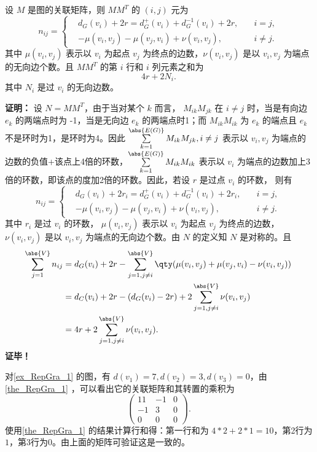 \begin{theorem}{}\label{the_RepGra_1}
设 $M$ 是图的关联矩阵，则 $MM^T$ 的 $(i,j)$ 元为
\begin{equation}
n_{ij}=\left\{\begin{aligned}
&d_G(v_i)+2r=d_G^+(v_i)+d_G^{-1}(v_i)+2r,\quad &i=j,\\
&-\mu(v_i,v_j)-\mu(v_j,v_i)+\nu(v_i,v_j),\quad &i\neq j.
\end{aligned}\right.~
\end{equation}
其中 $\mu(v_i,v_j)$ 表示以 $v_i$ 为起点 $v_j$ 为终点的边数，$\nu(v_i,v_j)$ 是以 $v_i,v_j$ 为端点的无向边个数。且 $MM^T$ 的第 $i$ 行和 $i$ 列元素之和为
\begin{equation}
4r+2N_i.~
\end{equation}
其中 $N_i$ 是过 $v_i$ 的无向边数。

\end{theorem}
\textbf{证明：}
设 $N=MM^T$，由于当对某个 $k$ 而言， $M_{ik}M_{jk}$ 在 $i\neq j$ 时，当是有向边 $e_k$ 的两端点时为 -1，当是无向边 $e_k$ 的两端点时1；而 $M_{ik}M_{ik}$ 为 $e_k$ 的端点且 $e_k$ 不是环时为1，是环时为4。因此 $\sum\limits_{k=1}^{\abs{E(G)}}M_{ik}M_{jk},i\neq j$ 表示以 $v_i,v_j$ 为端点的边数的负值+该点上4倍的环数，$\sum\limits_{k=1}^{\abs{E(G)}}M_{ik}M_{ik}$ 表示以 $v_i$ 为端点的边数加上3倍的环数，即该点的度加2倍的环数。因此，若设 $r$ 是过点 $v_i$ 的环数， 则有
\begin{equation}
n_{ij}=\left\{\begin{aligned}
&d_G(v_i)+2r_i=d_G^+(v_i)+d_G^{-1}(v_i)+2r_i,\quad &i=j,\\
&-\mu(v_i,v_j)-\mu(v_j,v_i)+\nu(v_i,v_j),\quad &i\neq j.
\end{aligned}\right.~
\end{equation}
其中 $r_i$ 是过 $v_i$ 的环数， $\mu(v_i,v_j)$ 表示以 $v_i$ 为起点 $v_j$ 为终点的边数，$\nu(v_i,v_j)$ 是以 $v_i,v_j$ 为端点的无向边个数。由 $N$ 的定义知 $N$ 是对称的。且 
\begin{equation}
\begin{aligned}
\sum_{j=1}^{\abs{V}}n_{ij}&=d_G(v_i)+2r-\sum_{j=1,j\neq i}^{\abs{V}}\qty(\mu(v_i,v_j)+\mu(v_j,v_i)-\nu(v_i,v_j))\\
&=d_C(v_i)+2r-(d_G(v_i)-2r)+2\sum_{j=1,j\neq i}^{\abs{V}}\nu(v_i,v_j)\\
&=4r+2\sum_{j=1,j\neq i}^{\abs{V}}\nu(v_i,v_j).
\end{aligned}
~
\end{equation}
\textbf{证毕！}
\begin{example}{}
对\autoref{ex_RepGra_1} 的图，有 $d(v_1)=7,d(v_2)=3,d(v_3)=0$，由\autoref{the_RepGra_1} ，可以看出它的关联矩阵和其转置的乘积为
\begin{equation}
\begin{pmatrix}
11&-1&0\\
-1&3&0\\
0&0&0
\end{pmatrix}.~
\end{equation}
使用\autoref{the_RepGra_1} 的结果计算行和得：第一行和为 $4*2+2*1=10$，第2行为 $1$，第3行为0。由上面的矩阵可验证这是一致的。

\end{example}




